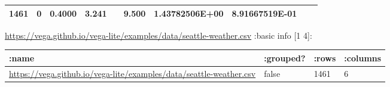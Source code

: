 \documentclass[]{article}
\begin{document}
\begin{longtable}[]{@{}llllllllll@{}}
\begin{minipage}[t]{0.05\columnwidth}
1461\strut
\end{minipage} & \begin{minipage}[t]{0.06\columnwidth}\raggedright
0\strut
\end{minipage} & \begin{minipage}[t]{0.06\columnwidth}\raggedright
0.4000\strut
\end{minipage} & \begin{minipage}[t]{0.06\columnwidth}\raggedright
3.241\strut
\end{minipage} & \begin{minipage}[t]{0.04\columnwidth}\raggedright
\strut
\end{minipage} & \begin{minipage}[t]{0.06\columnwidth}\raggedright
9.500\strut
\end{minipage} & \begin{minipage}[t]{0.11\columnwidth}\raggedright
1.43782506E+00\strut
\end{minipage} & \begin{minipage}[t]{0.09\columnwidth}\raggedright
8.91667519E-01\strut
\end{minipage}\tabularnewline
\bottomrule
\end{longtable}

\url{https://vega.github.io/vega-lite/examples/data/seattle-weather.csv}
:basic info {[}1 4{]}:

\begin{longtable}[]{@{}llll@{}}
\toprule
\begin{minipage}[b]{0.63\columnwidth}\raggedright
:name\strut
\end{minipage} & \begin{minipage}[b]{0.10\columnwidth}\raggedright
:grouped?\strut
\end{minipage} & \begin{minipage}[b]{0.06\columnwidth}\raggedright
:rows\strut
\end{minipage} & \begin{minipage}[b]{0.09\columnwidth}\raggedright
:columns\strut
\end{minipage}\tabularnewline
\midrule
\endhead
\begin{minipage}[t]{0.63\columnwidth}\raggedright
\url{https://vega.github.io/vega-lite/examples/data/seattle-weather.csv}\strut
\end{minipage} & \begin{minipage}[t]{0.10\columnwidth}\raggedright
false\strut
\end{minipage} & \begin{minipage}[t]{0.06\columnwidth}\raggedright
1461\strut
\end{minipage} & \begin{minipage}[t]{0.09\columnwidth}\raggedright
6\strut
\end{minipage}\tabularnewline
\bottomrule
\end{longtable}
\end{document}
